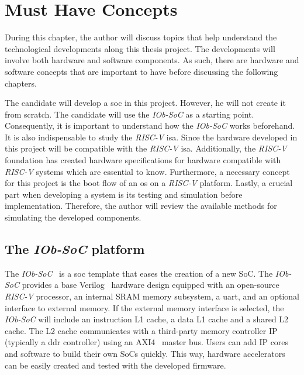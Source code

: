\chapter{Must Have Concepts}
\label{chapter:must_have_concepts}
During this chapter, the author will discuss topics that help understand the technological developments along this thesis project. The developments will involve both hardware and software components. As such, there are hardware and software concepts that are important to have before discussing the following chapters.

The candidate will develop a \acrshort{soc} in this project. However, he will not create it from scratch. The candidate will use the \textit{IOb-SoC} as a starting point. Consequently, it is important to understand how the \textit{IOb-SoC} works beforehand. It is also indispensable to study the \textit{RISC-V} \acrfull{isa}. Since the hardware developed in this project will be compatible with the \textit{RISC-V} \acrshort{isa}. Additionally, the \textit{RISC-V} foundation has created hardware specifications for hardware compatible with \textit{RISC-V} systems which are essential to know. Furthermore, a necessary concept for this project is the boot flow of an \acrfull{os} on a \textit{RISC-V} platform. Lastly, a crucial part when developing a system is its testing and simulation before implementation. Therefore, the author will review the available methods for simulating the developed components.

\section{The \textit{IOb-SoC} platform}
\label{section:iob_soc_template}
The \textit{IOb-SoC}~\cite{iob_soc} is a \acrfull{soc} template that eases the creation of a new SoC. The \textit{IOb-SoC} provides a base Verilog~\cite{thomas2008verilog} hardware design equipped with an open-source \textit{RISC-V} processor, an internal SRAM memory subsystem, a \acrshort{uart}, and an optional interface to external memory. If the external memory interface is selected, the \textit{IOb-SoC} will include an instruction L1 cache, a data L1 cache and a shared L2 cache. The L2 cache communicates with a third-party memory controller IP (typically a \acrshort{ddr} controller) using an AXI4~\cite{tidala2018high} master bus. Users can add IP cores and software to build their own SoCs quickly. This way, hardware accelerators can be easily created and tested with the developed firmware.

